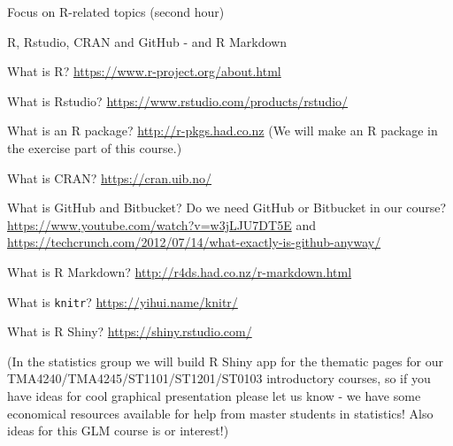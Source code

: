 \documentclass[
  ignorenonframetext,
]{beamer}
\begin{document}
\begin{frame}[fragile]
\begin{block}{Focus on R-related topics (second hour)}
\protect\hypertarget{focus-on-r-related-topics-second-hour}{}
\end{block}

\begin{block}{R, Rstudio, CRAN and GitHub - and R Markdown}
\protect\hypertarget{r-rstudio-cran-and-github---and-r-markdown}{}
\begin{block}{What is R?}
\protect\hypertarget{what-is-r}{}
\url{https://www.r-project.org/about.html}
\end{block}

\begin{block}{What is Rstudio?}
\protect\hypertarget{what-is-rstudio}{}
\url{https://www.rstudio.com/products/rstudio/}
\end{block}

\begin{block}{What is an R package?}
\protect\hypertarget{what-is-an-r-package}{}
\url{http://r-pkgs.had.co.nz} (We will make an R package in the exercise
part of this course.)
\end{block}

\begin{block}{What is CRAN?}
\protect\hypertarget{what-is-cran}{}
\url{https://cran.uib.no/}
\end{block}

\begin{block}{What is GitHub and Bitbucket?}
\protect\hypertarget{what-is-github-and-bitbucket}{}
Do we need GitHub or Bitbucket in our course?
\url{https://www.youtube.com/watch?v=w3jLJU7DT5E} and
\url{https://techcrunch.com/2012/07/14/what-exactly-is-github-anyway/}
\end{block}

\begin{block}{What is R Markdown?}
\protect\hypertarget{what-is-r-markdown}{}
\url{http://r4ds.had.co.nz/r-markdown.html}
\end{block}

\begin{block}{What is \texttt{knitr}?}
\protect\hypertarget{what-is-knitr}{}
\url{https://yihui.name/knitr/}
\end{block}

\begin{block}{What is R Shiny?}
\protect\hypertarget{what-is-r-shiny}{}
\url{https://shiny.rstudio.com/}

(In the statistics group we will build R Shiny app for the thematic
pages for our TMA4240/TMA4245/ST1101/ST1201/ST0103 introductory courses,
so if you have ideas for cool graphical presentation please let us know
- we have some economical resources available for help from master
students in statistics! Also ideas for this GLM course is or interest!)


\end{block}
\end{block}
\end{frame}
\end{document}
